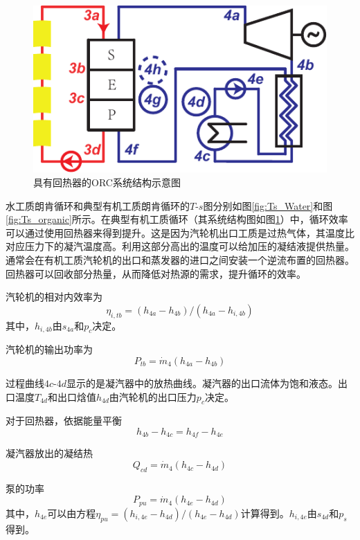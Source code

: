 \noindent \begin{figure}[htbp]
\begin{center}
	\includegraphics[width = 0.4\columnwidth]{fig/ORCsystem2.pdf}
	\caption{具有回热器的ORC系统结构示意图}
	\label{fig:ORCsystem2}
\end{center}
\end{figure}

水工质朗肯循环和典型有机工质朗肯循环的$T$-$s$图分别如图\ref{fig:Ts_Water}和图\ref{fig:Ts_organic}所示。在典型有机工质循环（其系统结构图如图\ref{fig:ORCsystem2}）中，循环效率可以通过使用回热器来得到提升。这是因为汽轮机出口工质是过热气体，其温度比对应压力下的凝汽温度高。利用这部分高出的温度可以给加压的凝结液提供热量。通常会在有机工质汽轮机的出口和蒸发器的进口之间安装一个逆流布置的回热器。回热器可以回收部分热量，从而降低对热源的需求，提升循环的效率。

汽轮机的相对内效率为
\begin{equation}
  \eta_{i,tb} = (h_{4a}-h_{4b})/(h_{4a}-h_{i,4b})
\end{equation}
其中，$h_{i,4b}$由$s_{4a}$和$p_c$决定。

汽轮机的输出功率为
\begin{equation}
  P_{tb}=\dot{m}_4(h_{4a}-h_{4b})
\end{equation}

过程曲线$4c$-$4d$显示的是凝汽器中的放热曲线。凝汽器的出口流体为饱和液态。出口温度$T_{4d}$和出口焓值$h_{4d}$由汽轮机的出口压力$p_c$决定。

对于回热器，依据能量平衡
\begin{equation}
  h_{4b} - h_{4c} = h_{4f} - h_{4e}
\end{equation}

凝汽器放出的凝结热
\begin{equation}
  Q_{cd} = \dot{m}_4 (h_{4c} - h_{4d})
\end{equation}

泵的功率
\begin{equation}
P_{pu}=\dot{m}_{4}(h_{4e}-h_{4d})
\end{equation}  
其中，$h_{4e}$可以由方程$\eta_{pu} = (h_{i,4e}-h_{4d})/(h_{4e}-h_{4d})$计算得到。$h_{i,4e}$由$s_{4d}$和$p_s$得到。
    
